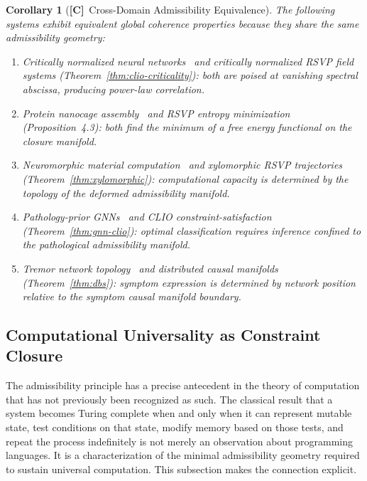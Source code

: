 \documentclass[11pt, oneside]{article}
\numberwithin{equation}{section}
\newcommand{\ClaimC}{\textcolor{rsvpgray!50}{\textbf{[C]}}}
\theoremstyle{rsvpstyle}
\newtheorem{corollary}[theorem]{Corollary}
\theoremstyle{remark}
\begin{document}
\begin{corollary}[\ClaimC\ Cross-Domain Admissibility Equivalence]
\label{cor:domains}
The following systems exhibit equivalent global coherence properties because they
share the same admissibility geometry:
\begin{enumerate}[label=(\roman*)]
  \item Critically normalized neural networks~\cite{Pachitariu2026Critical} and
    critically normalized RSVP field systems (Theorem~\ref{thm:clio-criticality}):
    both are poised at vanishing spectral abscissa, producing power-law correlation.
  \item Protein nanocage assembly~\cite{Lee2026Nanocages} and RSVP entropy minimization
    (Proposition~4.3): both find the minimum of a free energy functional on the closure
    manifold.
  \item Neuromorphic material computation~\cite{Li2026Stretchable} and xylomorphic
    RSVP trajectories (Theorem~\ref{thm:xylomorphic}): computational capacity is
    determined by the topology of the deformed admissibility manifold.
  \item Pathology-prior GNNs~\cite{Wu2026GNN} and CLIO constraint-satisfaction
    (Theorem~\ref{thm:gnn-clio}): optimal classification requires inference confined
    to the pathological admissibility manifold.
  \item Tremor network topology~\cite{Weigl2026Tremor} and distributed causal manifolds
    (Theorem~\ref{thm:dbs}): symptom expression is determined by network position
    relative to the symptom causal manifold boundary.
\end{enumerate}
\end{corollary}

\subsection{Computational Universality as Constraint Closure}

The admissibility principle has a precise antecedent in the theory of computation that
has not previously been recognized as such. The classical result that a system becomes
Turing complete when and only when it can represent mutable state, test conditions on
that state, modify memory based on those tests, and repeat the process indefinitely is
not merely an observation about programming languages. It is a characterization of the
minimal admissibility geometry required to sustain universal computation. This subsection
makes the connection explicit.
\end{document}
